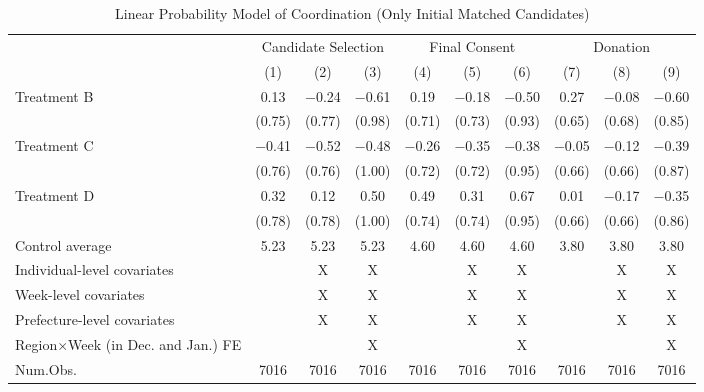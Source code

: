 \documentclass[12pt, a4paper]{article}
\begin{document}
\begin{table}[H]

\caption{\label{tab:lm-coordinate-initial-matched}Linear Probability Model of Coordination (Only Initial Matched Candidates)}
\centering
\fontsize{8}{10}\selectfont
\begin{threeparttable}
\begin{tabular}[t]{lccccccccc}
\toprule
\multicolumn{1}{c}{ } & \multicolumn{3}{c}{Candidate Selection} & \multicolumn{3}{c}{Final Consent} & \multicolumn{3}{c}{Donation} \\
\cmidrule(l{3pt}r{3pt}){2-4} \cmidrule(l{3pt}r{3pt}){5-7} \cmidrule(l{3pt}r{3pt}){8-10}
  & (1) & (2) & (3) & (4) & (5) & (6) & (7) & (8) & (9)\\
\midrule
Treatment B & \num{0.13} & \num{-0.24} & \num{-0.61} & \num{0.19} & \num{-0.18} & \num{-0.50} & \num{0.27} & \num{-0.08} & \num{-0.60}\\
 & (\num{0.75}) & (\num{0.77}) & (\num{0.98}) & (\num{0.71}) & (\num{0.73}) & (\num{0.93}) & (\num{0.65}) & (\num{0.68}) & (\num{0.85})\\
Treatment C & \num{-0.41} & \num{-0.52} & \num{-0.48} & \num{-0.26} & \num{-0.35} & \num{-0.38} & \num{-0.05} & \num{-0.12} & \num{-0.39}\\
 & (\num{0.76}) & (\num{0.76}) & (\num{1.00}) & (\num{0.72}) & (\num{0.72}) & (\num{0.95}) & (\num{0.66}) & (\num{0.66}) & (\num{0.87})\\
Treatment D & \num{0.32} & \num{0.12} & \num{0.50} & \num{0.49} & \num{0.31} & \num{0.67} & \num{0.01} & \num{-0.17} & \num{-0.35}\\
 & (\num{0.78}) & (\num{0.78}) & (\num{1.00}) & (\num{0.74}) & (\num{0.74}) & (\num{0.95}) & (\num{0.66}) & (\num{0.66}) & (\num{0.86})\\
\midrule
Control average & 5.23 & 5.23 & 5.23 & 4.60 & 4.60 & 4.60 & 3.80 & 3.80 & 3.80\\
Individual-level covariates &  & X & X &  & X & X &  & X & X\\
Week-level covariates &  & X & X &  & X & X &  & X & X\\
Prefecture-level covariates &  & X & X &  & X & X &  & X & X\\
Region$\times$Week (in Dec. and Jan.) FE &  &  & X &  &  & X &  &  & X\\
Num.Obs. & \num{7016} & \num{7016} & \num{7016} & \num{7016} & \num{7016} & \num{7016} & \num{7016} & \num{7016} & \num{7016}\\
\bottomrule
\end{tabular}

\end{threeparttable}
\end{table}
\end{document}
